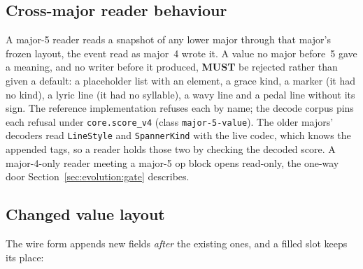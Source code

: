 \documentclass[11pt,letterpaper]{report}
\newcommand{\MUST}{\textbf{MUST}}
\begin{document}
\subsection{Cross-major reader behaviour}
A major-5 reader reads a snapshot of any lower major through that major's
frozen layout, the event read as major~4 wrote it. A value no major before~5
gave a meaning, and no writer before it produced, \MUST{} be rejected rather
than given a default: a placeholder list with an element, a grace kind, a
marker (it had no kind), a lyric line (it had no syllable), a wavy line and a
pedal line without its sign. The reference implementation refuses each by
name; the decode corpus pins each refusal under \texttt{core.score\_v4}
(class \texttt{major-5-value}). The older majors' decoders read
\texttt{LineStyle} and \texttt{SpannerKind} with the live codec, which knows
the appended tags, so a reader holds those two by checking the decoded score.
A major-4-only reader meeting a major-5 op block opens read-only, the
one-way door Section~\ref{sec:evolution:gate} describes.

\subsection{Changed value layout}
The wire form appends new fields \emph{after} the existing ones, and a filled
slot keeps its place:
\end{document}
